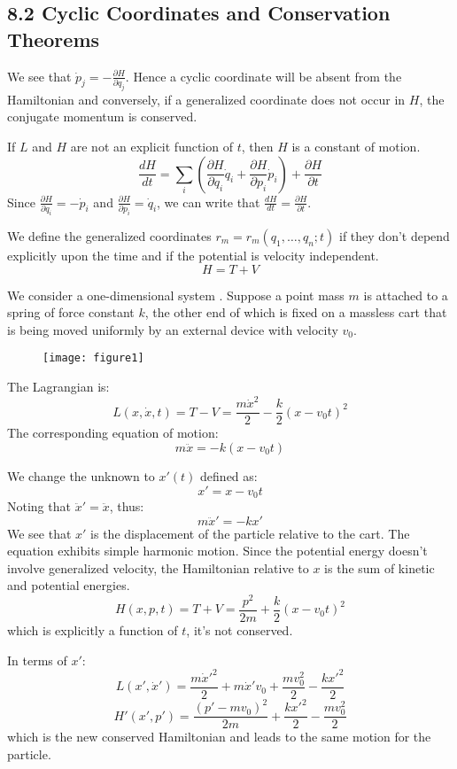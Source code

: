 \documentclass[12pt]{article}
\begin{document}
	\subsection*{8.2 Cyclic Coordinates and Conservation Theorems}
	We see that $\dot{p}_j = -\frac{\partial H}{\partial q_j}$.
	Hence a cyclic coordinate will be absent from the Hamiltonian and conversely, if a generalized coordinate does not occur in $H$, the conjugate momentum is conserved.
	
	If $L$ and $H$ are not an explicit function of $t$, then $H$ is a constant of motion.
	\[ \frac{dH}{dt} = \sum_i \left( \frac{\partial H}{\partial q_i} \dot{q}_i + \frac{\partial H}{\partial p_i} \dot{p}_i \right) + \frac{\partial H}{\partial t} \]
	Since $\frac{\partial H}{\partial q_i} = -\dot{p}_i$ and $\frac{\partial H}{\partial p_i} = \dot{q}_i$,
	we can write that $\frac{dH}{dt} = \frac{\partial H}{\partial t}$.
	
	We define the generalized coordinates $r_m = r_m(q_1, \dots, q_n; t)$ if they don't depend explicitly upon the time and if the potential is velocity independent.
	\[ H = T + V \]
	
	We consider a one-dimensional system . Suppose a point mass $m$ is attached to a spring of force constant $k$, the other end of which is fixed on a massless cart that is being moved uniformly by an external device with velocity $v_0$.
	
	\begin{figure}[h]
		\centering
		\texttt{[image: figure1]}
		\caption{}
		\label{fig:figure1}
	\end{figure}
	
	The Lagrangian is:
	\[ L(x, \dot{x}, t) = T - V = \frac{m\dot{x}^2}{2} - \frac{k}{2}(x - v_0 t)^2 \]
	The corresponding equation of motion:
	\[ m\ddot{x} = -k(x - v_0 t) \]
	
	We change the unknown to $x'(t)$ defined as:
	\[ x' = x - v_0 t \]
	Noting that $\ddot{x}' = \ddot{x}$, thus:
	\[ m\ddot{x}' = -kx' \]
	We see that $x'$ is the displacement of the particle relative to the cart. The equation exhibits simple harmonic motion.
	Since the potential energy doesn't involve generalized velocity, the Hamiltonian relative to $x$ is the sum of kinetic and potential energies.
	\[ H(x, p, t) = T + V = \frac{p^2}{2m} + \frac{k}{2}(x - v_0 t)^2 \]
	which is explicitly a function of $t$, it's not conserved.
	
	In terms of $x'$:
	\[ L(x', \dot{x}') = \frac{m\dot{x}'^2}{2} + m\dot{x}'v_0 + \frac{mv_0^2}{2} - \frac{kx'^2}{2} \]
	\[ H'(x', p') = \frac{(p' - mv_0)^2}{2m} + \frac{kx'^2}{2} - \frac{mv_0^2}{2} \]
	which is the new conserved Hamiltonian and leads to the same motion for the particle.
	
\end{document}
